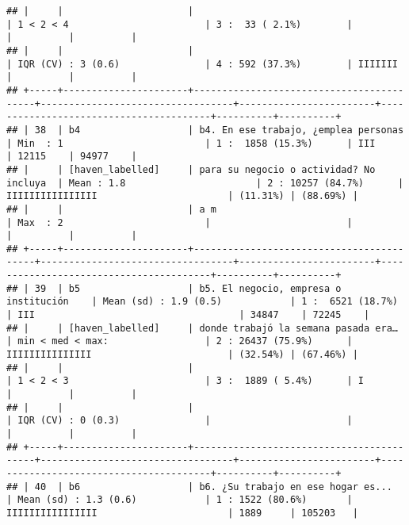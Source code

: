 \documentclass[]{article}
\begin{document}
\begin{verbatim}
## |     |                      |                                          | 1 < 2 < 4                        | 3 :  33 ( 2.1%)        |                                        |          |          |
## |     |                      |                                          | IQR (CV) : 3 (0.6)               | 4 : 592 (37.3%)        | IIIIIII                                |          |          |
## +-----+----------------------+------------------------------------------+----------------------------------+------------------------+----------------------------------------+----------+----------+
## | 38  | b4                   | b4. En ese trabajo, ¿emplea personas     | Min  : 1                         | 1 :  1858 (15.3%)      | III                                    | 12115    | 94977    |
## |     | [haven_labelled]     | para su negocio o actividad? No incluya  | Mean : 1.8                       | 2 : 10257 (84.7%)      | IIIIIIIIIIIIIIII                       | (11.31%) | (88.69%) |
## |     |                      | a m                                      | Max  : 2                         |                        |                                        |          |          |
## +-----+----------------------+------------------------------------------+----------------------------------+------------------------+----------------------------------------+----------+----------+
## | 39  | b5                   | b5. El negocio, empresa o institución    | Mean (sd) : 1.9 (0.5)            | 1 :  6521 (18.7%)      | III                                    | 34847    | 72245    |
## |     | [haven_labelled]     | donde trabajó la semana pasada era…      | min < med < max:                 | 2 : 26437 (75.9%)      | IIIIIIIIIIIIIII                        | (32.54%) | (67.46%) |
## |     |                      |                                          | 1 < 2 < 3                        | 3 :  1889 ( 5.4%)      | I                                      |          |          |
## |     |                      |                                          | IQR (CV) : 0 (0.3)               |                        |                                        |          |          |
## +-----+----------------------+------------------------------------------+----------------------------------+------------------------+----------------------------------------+----------+----------+
## | 40  | b6                   | b6. ¿Su trabajo en ese hogar es...       | Mean (sd) : 1.3 (0.6)            | 1 : 1522 (80.6%)       | IIIIIIIIIIIIIIII                       | 1889     | 105203   |

\end{verbatim}
\end{document}
